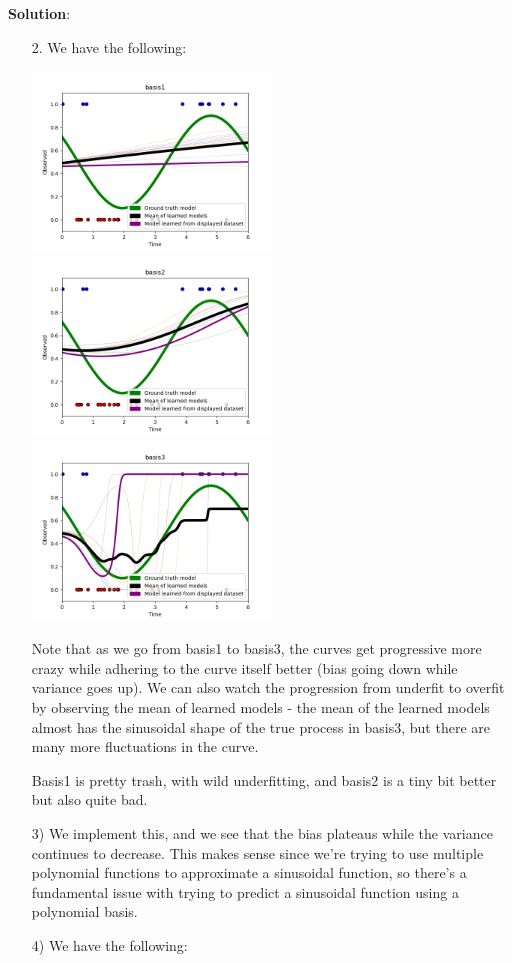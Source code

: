 \documentclass[submit]{../harvardml}
\newenvironment{solution}{
    \vspace{2mm}
    \color{blue}\noindent\textbf{Solution}:
}{}
\begin{document}
\begin{solution}
	\begin{itemize}
    \item[2.] We have the following:
    \begin{center}
      \includegraphics[width=0.5\textwidth]{img_output/basis1.png}
      \includegraphics[width=0.5\textwidth]{img_output/basis2.png}
      \includegraphics[width=0.5\textwidth]{img_output/basis3.png}
    \end{center}
    Note that as we go from basis1 to basis3, the curves get progressive more crazy while adhering to the curve itself better (bias going down while variance goes up). We can also watch the progression from underfit to overfit by observing the mean of learned models - the mean of the learned models almost has the sinusoidal shape of the true process in basis3, but there are many more fluctuations in the curve. \par
    Basis1 is pretty trash, with wild underfitting, and basis2 is a tiny bit better but also quite bad. 
    \item[3)] We implement this, and we see that the bias plateaus while the variance continues to decrease. This makes sense since we're trying to use multiple polynomial functions to approximate a sinusoidal function, so there's a fundamental issue with trying to predict a sinusoidal function using a polynomial basis. \item[4)] We have the following:

\end{itemize}
\end{solution}
\end{document}
